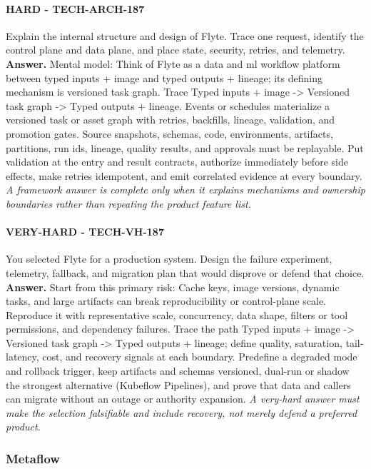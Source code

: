 \paragraph{HARD - TECH-ARCH-187} Explain the internal structure and design of Flyte. Trace one request, identify the control plane and data plane, and place state, security, retries, and telemetry.
\textbf{Answer.} Mental model: Think of Flyte as a data and ml workflow platform between typed inputs + image and typed outputs + lineage; its defining mechanism is versioned task graph. Trace Typed inputs + image -> Versioned task graph -> Typed outputs + lineage. Events or schedules materialize a versioned task or asset graph with retries, backfills, lineage, validation, and promotion gates. Source snapshots, schemas, code, environments, artifacts, partitions, run ids, lineage, quality results, and approvals must be replayable. Put validation at the entry and result contracts, authorize immediately before side effects, make retries idempotent, and emit correlated evidence at every boundary.
\textit{A framework answer is complete only when it explains mechanisms and ownership boundaries rather than repeating the product feature list.}
\paragraph{VERY-HARD - TECH-VH-187} You selected Flyte for a production system. Design the failure experiment, telemetry, fallback, and migration plan that would disprove or defend that choice.
\textbf{Answer.} Start from this primary risk: Cache keys, image versions, dynamic tasks, and large artifacts can break reproducibility or control-plane scale. Reproduce it with representative scale, concurrency, data shape, filters or tool permissions, and dependency failures. Trace the path Typed inputs + image -> Versioned task graph -> Typed outputs + lineage; define quality, saturation, tail-latency, cost, and recovery signals at each boundary. Predefine a degraded mode and rollback trigger, keep artifacts and schemas versioned, dual-run or shadow the strongest alternative (Kubeflow Pipelines), and prove that data and callers can migrate without an outage or authority expansion.
\textit{A very-hard answer must make the selection falsifiable and include recovery, not merely defend a preferred product.}
\subsubsection*{Metaflow}

